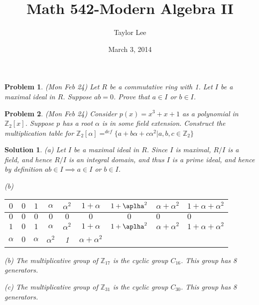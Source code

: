 \documentclass[12pt]{article}
\theoremstyle{moo}
\newtheorem*{prob}{Problem}
\newtheorem*{sol}{Solution}
\def\zz{{\mathbb Z}}
\begin{document}
\fontseries {\seriesdefault}
\fontshape {\shapedefault}
\selectfont

\title{ Math 542-Modern Algebra II}
\date{March 3, 2014}         %
\author{Taylor Lee}      %
\maketitle                      %



\begin{prob}
(Mon Feb 24) Let $R$ be a commutative ring with 1.  Let $I$ be
a maximal ideal in $R$.  Suppose $ab=0$. Prove that $a\in I$ or 
$b\in I$.
\end{prob}

\begin{prob}
(Mon Feb 24) Consider $p(x)=x^3+x+1$ as a polynomial in $\zz_2[x]$.
Suppose $p$ has a root $\alpha$ is in some field extension.  Construct
the multiplication table for 
$\zz_2[\alpha]=^{def}\{a+b\alpha+c\alpha^2 | a,b,c\in \zz_2\}$
\end{prob}

\begin{sol}
(a) Let $I$ be a maximal ideal in $R$. Since $I$ is maximal, $R/I$ is a field, and hence $R/I$ is an integral domain, and thus $I$ is a prime ideal, and hence by definition $ab \in I \implies a \in I$ or $b \in I$.


(b)

\begin{tabular}{|c|c|c|c|c|c|c|}

\hline
$0$ & $0$ & $1$ & $\alpha$ & $\alpha^2$ & $1 + \alpha$ & $1 + \aplha^2 $ & $\alpha + \alpha^2$ & $1 + \alpha + \alpha^2$ \\
\hline
$0$ & $0$ & $0$ & $0$ & $0$ & $0$ & $0$ & $0$ & $0$\\
\hline
$1$ & $0$ & $1$ & $\alpha$ & $\alpha^2$ & $1 + \alpha$ & $1 + \aplha^2 $ & $\alpha + \alpha^2$ & $1 + \alpha + \alpha^2$ \\
\hline
$\alpha$ & $0$ & $\alpha$ & $\alpha^2$ & 1 & $\alpha + \alpha^2$
\end{tabular}


(b) The multiplicative group of $\zz_{17}$ is the cyclic group $C_{16}$. This group has 8 generators.

(c) The multiplicative group of $\zz_{31}$ is the cyclic group $C_{30}$. This group has 8 generators.

\end{sol}
\end{document}
